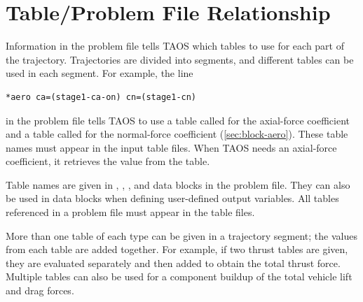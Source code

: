 \section{Table/Problem File Relationship}\label{sec:table-problem-relationship}

Information in the problem file tells TAOS which tables to use for each part of the
trajectory. Trajectories are divided into segments, and different tables can be used in
each segment. For example, the line

\begin{lstlisting}[style=taosmanual]
*aero ca=(stage1-ca-on) cn=(stage1-cn)
\end{lstlisting}

in the problem file tells TAOS to use a table called  for the
axial-force coefficient and a table called  for the normal-force
coefficient (\cref{sec:block-aero}). These table names must appear in the input table
files. When TAOS needs an axial-force coefficient, it retrieves the value from the
 table.

Table names are given in , ,
, and  data blocks in the problem file. They
can also be used in  data blocks when defining user-defined
output variables. All tables referenced in a problem file must appear in the table
files.

More than one table of each type can be given in a trajectory segment; the values
from each table are added together. For example, if two thrust tables are given, they
are evaluated separately and then added to obtain the total thrust force. Multiple
tables can also be used for a component buildup of the total vehicle lift and drag
forces.
